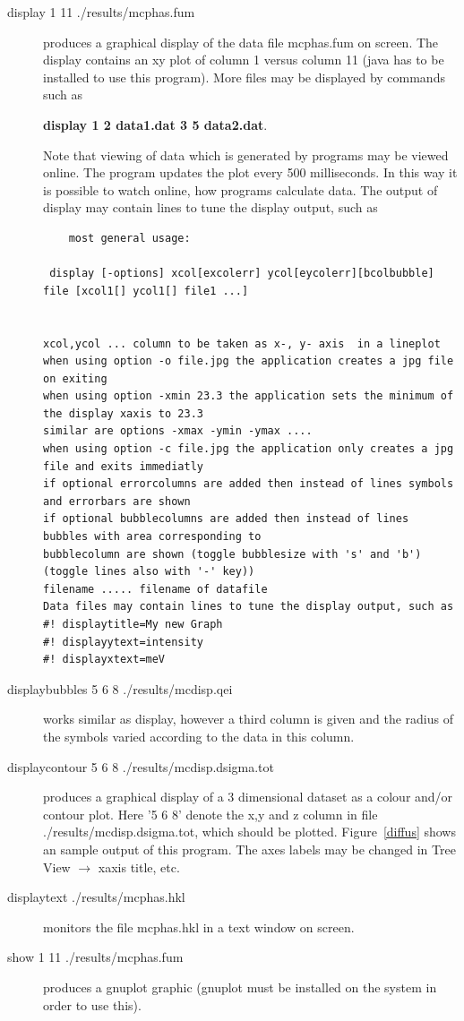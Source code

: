 \begin{description} 
\item [display 1 11 ./results/mcphas.fum] produces a graphical display of the data %
file
mcphas.fum on screen. The display contains an xy plot of column 1 versus column 11
({\prg java} has to be installed to use this program). 
More files may be displayed by commands such as

{\bf display 1 2 data1.dat 3 5 data2.dat}.

Note that viewing of 
data which is generated by programs may be viewed online. The program updates the plot
every 500 milliseconds. In this way it is possible to watch online, how programs
calculate data. The output of display may contain lines to tune the display output, %
such as
\begin{verbatim}
	most general usage: 

 display [-options] xcol[excolerr] ycol[eycolerr][bcolbubble] file [xcol1[] ycol1[] file1 ...]


xcol,ycol ... column to be taken as x-, y- axis  in a lineplot
when using option -o file.jpg the application creates a jpg file on exiting
when using option -xmin 23.3 the application sets the minimum of the display xaxis to 23.3
similar are options -xmax -ymin -ymax ....
when using option -c file.jpg the application only creates a jpg file and exits immediatly
if optional errorcolumns are added then instead of lines symbols and errorbars are shown
if optional bubblecolumns are added then instead of lines bubbles with area corresponding to
bubblecolumn are shown (toggle bubblesize with 's' and 'b')
(toggle lines also with '-' key))
filename ..... filename of datafile
Data files may contain lines to tune the display output, such as
#! displaytitle=My new Graph
#! displayytext=intensity
#! displayxtext=meV 
\end{verbatim} 

\item [displaybubbles  5 6 8 ./results/mcdisp.qei] works similar as display, however
a third column is given and the radius of the symbols varied according to the data in 
this column.

\item [displaycontour 5 6 8 ./results/mcdisp.dsigma.tot] produces a graphical
display of a 3 dimensional dataset as a colour and/or contour plot. Here '5 6 8' 
denote the x,y and z column in file {\prg ./results/mcdisp.dsigma.tot}, which should
be plotted. Figure~\ref{diffus} shows an sample output of this program. The axes labels may be changed
in Tree View $\rightarrow$ xaxis title, etc.

\item [displaytext ./results/mcphas.hkl] monitors the file mcphas.hkl in a text window
on screen.

\item [show 1 11 ./results/mcphas.fum]     produces a gnuplot graphic 
({\prg gnuplot} must be installed
on the system in order to use this).
\end{description} 

